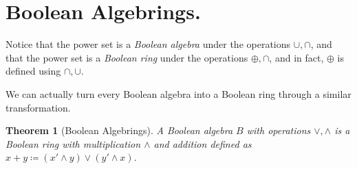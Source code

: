 \documentclass[10pt, letterpaper]{article}
\newtheorem{theorem}{Theorem}
\theoremstyle{definition}
\begin{document}
\section{Boolean Algebrings.}\label{section 3}

Notice that the power set is a \textit{Boolean algebra} under the operations
\(\cup, \cap\), and that the power set is a \textit{Boolean ring} under the operations
\(\oplus, \cap\), and in fact, \(\oplus\) is defined using \(\cap, \cup\).

We can actually turn every Boolean algebra into a Boolean ring through a similar transformation.
\begin{theorem}[Boolean Algebrings]
	A Boolean algebra \(B\) with operations \(\vee, \wedge\) is a Boolean ring with
	multiplication \(\wedge\) and addition defined as 
	\(x+y\coloneqq (x'\wedge y)\vee(y'\wedge x)\).
\end{theorem}
\end{document}
